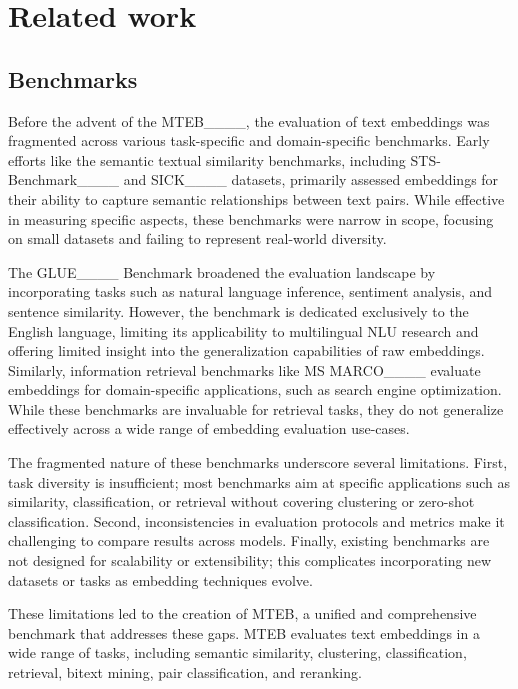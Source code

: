 \section{Related work}
\subsection{Benchmarks}
Before the advent of the MTEB____, the evaluation of text embeddings was fragmented across various task-specific and domain-specific benchmarks. Early efforts like the semantic textual similarity benchmarks, including STS-Benchmark____ and SICK____ datasets, primarily assessed embeddings for their ability to capture semantic relationships between text pairs. While effective in measuring specific aspects, %
these benchmarks were narrow in scope, focusing on small datasets and failing to represent real-world diversity.

The GLUE____ Benchmark broadened the evaluation landscape by incorporating tasks such as natural language inference, sentiment analysis, and sentence similarity. However, the benchmark is dedicated exclusively to the English language, limiting its applicability to multilingual NLU research and offering limited insight into the generalization capabilities of raw embeddings. Similarly, information retrieval benchmarks like MS MARCO____ evaluate embeddings for domain-specific applications, such as search engine optimization. While these benchmarks are invaluable for retrieval tasks, they do not generalize %
effectively across a wide range of embedding evaluation use-cases.


The fragmented nature of these benchmarks underscore several limitations. First, task diversity is insufficient; most benchmarks aim at specific applications such as similarity, classification, or retrieval without covering clustering or zero-shot classification. 
Second, inconsistencies in evaluation protocols and metrics make it challenging to compare results across models. Finally, existing benchmarks are not designed for scalability or extensibility; this complicates incorporating %
new datasets or tasks as embedding techniques evolve.

These limitations led to the creation of MTEB, a unified and comprehensive benchmark that addresses these gaps. MTEB evaluates text embeddings in a wide range of tasks, including semantic similarity, clustering, classification, retrieval, bitext mining, pair classification, and reranking.

